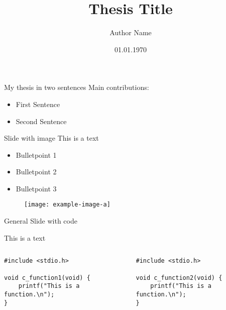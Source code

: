 \documentclass[10pt,aspectratio=1610]{beamer}
\title[XM\_0123]{Thesis Title}
\date{01.01.1970}
\author{Author Name}
\institute{Supervisor: Dr. Doctor \\ \\ VU Amsterdam - CSec}
\begin{document}

\logo{\vspace{-0.6cm}\hspace{0.855\paperwidth}}

\maketitle

\begin{frame}[fragile]{My thesis in two sentences}
    Main contributions:
    \begin{itemize}
        \item First Sentence
        \item Second Sentence
    \end{itemize}
\end{frame}

\begin{frame}[fragile]{Slide with image}
    This is a text
    \begin{itemize}
        \item Bulletpoint 1
        \item Bulletpoint 2
        \item Bulletpoint 3
    \end{itemize}
    \begin{figure}
        \centering
        \texttt{[image: example-image-a]}
        \label{fig:fig_1}
    \end{figure}
\end{frame}

\begin{frame}[fragile]{General Slide with code}
    \begin{center}
            This is a text
    \end{center}

    \begin{columns}
        \begin{column}{0.50\textwidth}
\begin{lstlisting}[style=cstyle]
#include <stdio.h>

void c_function1(void) {
	printf("This is a function.\n");
}
\end{lstlisting}
        \end{column}
    
        \begin{column}{0.50\textwidth}
\begin{lstlisting}[style=cstyle]
#include <stdio.h>

void c_function2(void) {
	printf("This is a function.\n");
}
\end{lstlisting}
        \end{column}
    \end{columns}
\end{frame}
\end{document}
